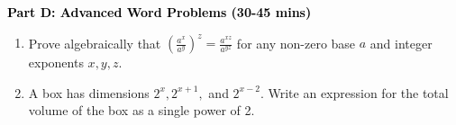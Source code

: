 \documentclass[12pt, letterpaper, fleqn]{article}
\begin{document}
\newpage

\begin{tcolorbox}[colback=customteal!20]
\large\textcolor{black}{\textbf{Part D: Advanced Word Problems (30-45 mins)}}
\end{tcolorbox}

\vspace{3mm}

\begin{enumerate}[itemsep=5.5cm, leftmargin=0.6cm, resume]
\item Prove algebraically that $\left(\frac{a^x}{a^y}\right)^z = \frac{a^{xz}}{a^{yz}}$ for any non-zero base $a$ and integer exponents $x, y, z$.
\item A box has dimensions $2^x, 2^{x+1},$ and $2^{x-2}$. Write an expression for the total volume of the box as a single power of 2.
\end{enumerate}
\end{document}
